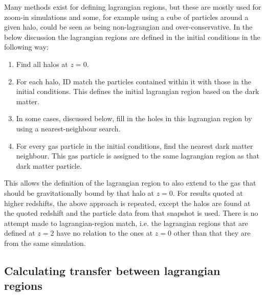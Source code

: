 Many methods exist for defining lagrangian regions, but these are mostly used for
zoom-in simulations and some, for example using a cube of particles around a given
halo, could be seen as being non-lagrangian and over-conservative. In the below
discussion the lagrangian regions are defined in the initial conditions in the
following way:
\begin{enumerate}
	\item Find all halos at $z=0$.

    \item For each halo, ID match the particles contained within it with those
		  in the initial conditions. This defines the initial lagrangian region
		  based on the dark matter.

	\item In some cases, discussed below, fill in the holes in this lagrangian
	      region by using a nearest-neighbour search.

	\item For every gas particle in the initial conditions, find the nearest dark
	      matter neighbour. This gas particle is assigned to the same lagrangian
	      region as that dark matter particle.
\end{enumerate}
This allows the definition of the lagrangian region to also extend to the gas
that should be gravitationally bound by that halo at $z=0$. For results quoted
at higher redshifts, the above approach is repeated, except the halos are
found at the quoted redshift and the particle data from that snapshot is used.
There is no attempt made to lagrangian-region match, i.e. the lagrangian regions
that are defined at $z=2$ have no relation to the ones at $z=0$ other than that
they are from the same simulation.

\subsection{Calculating transfer between lagrangian regions}


